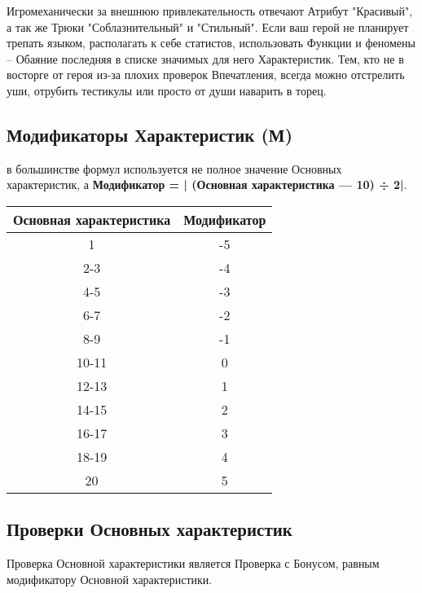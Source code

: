 \begin{tcolorbox}
    Игромеханически за внешнюю привлекательность отвечают Атрибут "Красивый", а так же Трюки "Соблазнительный" и "Стильный". 
    \newline Если ваш герой не планирует трепать языком, располагать к себе статистов, использовать Функции и феномены – Обаяние последняя в списке значимых для него Характеристик. Тем, кто не в восторге от героя из-за плохих проверок Впечатления, всегда можно отстрелить уши, отрубить тестикулы или просто от души наварить в торец.
\end{tcolorbox}

\subsection{Модификаторы Характеристик (М)} в большинстве формул используется не полное значение Основных характеристик, а \textbf{Модификатор = | (Основная характеристика — 10) ÷ 2|}.
\begin{center}
\begin{tabular}{ |c|c| }
\hline
\textbf{Основная характеристика} & \textbf{Модификатор}
\\ \hline
1 & -5
\\ \hline
2-3 & -4
\\ \hline
4-5 & -3
\\ \hline
6-7 & -2
\\ \hline
8-9 & -1
\\ \hline
10-11 & 0
\\ \hline
12-13 & 1
\\ \hline
14-15 & 2
\\ \hline
16-17 & 3
\\ \hline
18-19 & 4
\\ \hline
20 & 5
\\ \hline
\end{tabular}
\end{center}
\subsection{Проверки Основных характеристик}
Проверка Основной характеристики является Проверка с Бонусом, равным модификатору Основной характеристики.

